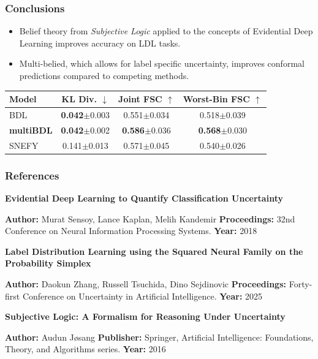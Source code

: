 \documentclass[aspectratio=169]{beamer}
\begin{document}
\begin{frame}[t]
    \frametitle{Conclusions}
    \begin{itemize}
        \item Belief theory from \textit{Subjective Logic} applied to the concepts of Evidential Deep Learning improves accuracy on LDL tasks.
        \item Multi-belied, which allows for label specific uncertainty, improves conformal predictions compared to competing methods.
    \end{itemize}
    
    \begin{table}
        \centering
        \label{tab:sjaffe_results}
        \begin{tabular}{lccc}
            \toprule
            \textbf{Model} & \textbf{KL Div.} $\downarrow$ & \textbf{Joint FSC} $\uparrow$ & \textbf{Worst-Bin FSC} $\uparrow$ \\
            \midrule
            BDL              & \textbf{0.042}$\pm$0.003 & 0.551$\pm$0.034 & 0.518$\pm$0.039 \\
            \textbf{multiBDL} & \textbf{0.042}$\pm$0.002 & \textbf{0.586}$\pm$0.036 & \textbf{0.568}$\pm$0.030 \\
            SNEFY            & 0.141$\pm$0.013 & 0.571$\pm$0.045 & 0.540$\pm$0.026 \\
            \bottomrule
        \end{tabular}
    \end{table}
\end{frame}


\begin{frame}[t]
    \frametitle{References}
    
    \textbf{Evidential Deep Learning to Quantify Classification Uncertainty}
    \vspace{0.2cm}
    
    \textbf{Author:} Murat Sensoy, Lance Kaplan, Melih Kandemir 
    \textbf{Proceedings:} 32nd Conference on Neural Information Processing Systems.
    \textbf{Year:} 2018 
    \vspace{0.5cm}
    
    \textbf{Label Distribution Learning using the Squared Neural Family on the Probability Simplex}
    \vspace{0.2cm}
    
    \textbf{Author:} Daokun Zhang, Russell Tsuchida, Dino Sejdinovic
    \textbf{Proceedings:} Forty-first Conference on Uncertainty in Artificial Intelligence.
    \textbf{Year:} 2025 
    \vspace{0.5cm}
    
    \textbf{Subjective Logic: A Formalism for Reasoning Under Uncertainty}
    \vspace{0.2cm}
    
    \textbf{Author:} Audun Jøsang
    \textbf{Publisher:} Springer, Artificial Intelligence: Foundations, Theory, and Algorithms series.
    \textbf{Year:} 2016
\end{frame}
\end{document}
